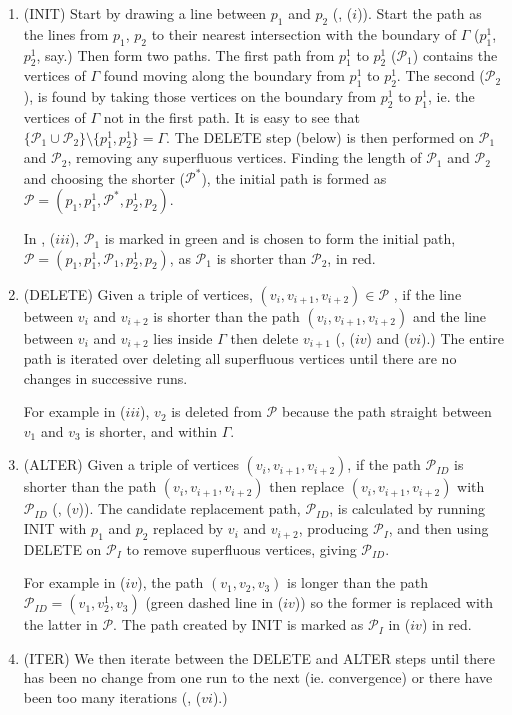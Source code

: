 \begin{enumerate}
\item (INIT) Start by drawing a line between $p_1$ and $p_2$ (, ($i$)). Start the path as the lines from $p_1$, $p_2$ to their nearest intersection with the boundary of $\Gamma$ ($p_1^1$, $p_2^1$, say.) Then form two paths. The first path from $p_1^1$ to $p_2^1$ ($\mathcal{P}_1$) contains the vertices of $\Gamma$ found moving along the boundary from $p_1^1$ to $p_2^1$. The second ($\mathcal{P}_2$), is found by taking those vertices on the boundary from $p_2^1$ to $p_1^1$, ie. the vertices of $\Gamma$ not in the first path. It is easy to see that $\{\mathcal{P}_1 \cup \mathcal{P}_2\} \setminus \{p_1^1, p_2^1\} = \Gamma$. The DELETE step (below) is then performed on $\mathcal{P}_1$ and $\mathcal{P}_2$, removing any superfluous vertices. Finding the length of $\mathcal{P}_1$ and $\mathcal{P}_2$ and choosing the shorter ($\mathcal{P^*}$), the initial path is formed as $\mathcal{P}=(p_1,p_1^1,\mathcal{P}^*,p_2^1,p_2)$. 

In , ($iii$), $\mathcal{P}_1$ is marked in green and is chosen to form the initial path, $\mathcal{P}=(p_1,p_1^1,\mathcal{P}_1,p_2^1,p_2)$, as $\mathcal{P}_1$ is shorter than $\mathcal{P}_2$, in red.

\item (DELETE) Given a triple of vertices, $(v_i, v_{i+1}, v_{i+2}) \in \mathcal{P}$ , if the line between $v_i$ and $v_{i+2}$ is shorter than the path $(v_i, v_{i+1}, v_{i+2})$ and the line between $v_i$ and $v_{i+2}$ lies inside $\Gamma$ then delete $v_{i+1}$ (, ($iv$) and ($vi$).) The entire path is iterated over deleting all superfluous vertices until there are no changes in successive runs. 

For example in  ($iii$), $v_2$ is deleted from $\mathcal{P}$ because the path straight between $v_1$ and $v_3$ is shorter, and within $\Gamma$.

\item (ALTER) Given a triple of vertices $(v_i, v_{i+1}, v_{i+2})$, if the path $\mathcal{P}_{ID}$ is shorter than the path $(v_i, v_{i+1}, v_{i+2})$ then replace $(v_i, v_{i+1}, v_{i+2})$ with $\mathcal{P}_{ID}$ (, ($v$)). The candidate replacement path, $\mathcal{P}_{ID}$, is calculated by running INIT with $p_1$ and $p_2$ replaced by $v_i$ and $v_{i+2}$, producing $\mathcal{P}_I$, and then using DELETE on $\mathcal{P}_I$ to remove superfluous vertices, giving $\mathcal{P}_{ID}$.

For example in  ($iv$), the path $(v_1, v_2, v_3)$ is longer than the path $\mathcal{P}_{ID}=(v_1, v^1_2, v_3)$ (green dashed line in ($iv$)) so the former is replaced with the latter in $\mathcal{P}$. The path created by INIT is marked as $\mathcal{P}_{I}$ in  ($iv$) in red.

\item (ITER) We then iterate between the DELETE and ALTER steps until there has been no change from one run to the next (ie. convergence) or there have been too many iterations (, ($vi$).)
\end{enumerate}


